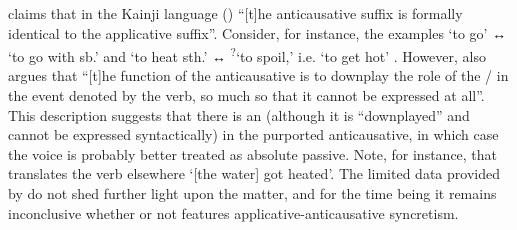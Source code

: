 \cite[223]{mcgill:2009} claims that in the Kainji language  () “[t]he anticausative suffix  is formally identical to the applicative suffix”. Consider, for instance, the examples  ‘to go’ ↔  ‘to go with sb.’ and  ‘to heat sth.’ ↔  \textsuperscript{?}‘to spoil,’ i.e. ‘to get hot’ \citep[134, 142, 223f.]{mcgill:2009}. However, \cite[224]{mcgill:2009} also argues that “[t]he function of the anticausative is to downplay the role of the / in the event denoted by the verb, so much so that it cannot be expressed at all”. This description suggests that there is an  (although it is “downplayed” and cannot be expressed syntactically) in the purported anticausative, in which case the voice is probably better treated as absolute passive. Note, for instance, that \citeauthor{mcgill:2009} translates the verb  elsewhere ‘[the water] got heated’. The limited data provided by \citeauthor{mcgill:2009} do not shed further light upon the matter, and for the time being it remains inconclusive whether or not  features applicative-anticausative syncretism. 

